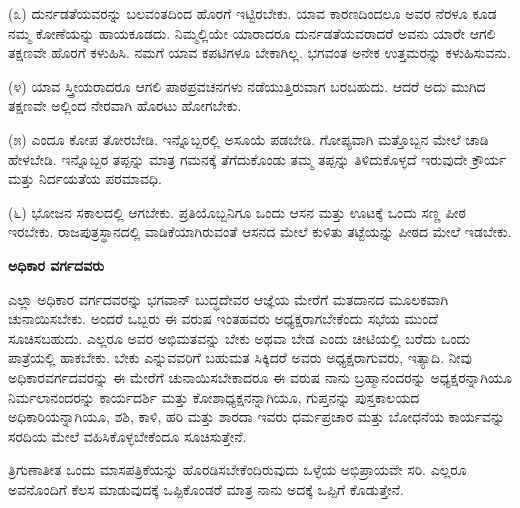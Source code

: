\vspace{0.15cm}

(೩) ದುರ್ನಡತೆಯವರನ್ನು ಬಲವಂತದಿಂದ ಹೊರಗೆ ಇಟ್ಟಿರಬೇಕು. ಯಾವ ಕಾರಣದಿಂದಲೂ ಅವರ ನೆರಳೂ ಕೂಡ ನಮ್ಮ ಕೋಣೆಯನ್ನು ಹಾಯಕೂಡದು. ನಿಮ್ಮಲ್ಲಿಯೇ ಯಾರಾದರೂ ದುರ್ನಡತೆಯವರಾದರೆ ಅವನು ಯಾರೇ ಆಗಲಿ ತಕ್ಷಣವೇ ಹೊರಗೆ ಕಳುಹಿಸಿ. ನಮಗೆ ಯಾವ ಕಪಟಿಗಳೂ ಬೇಕಾಗಿಲ್ಲ. ಭಗವಂತ ಅನೇಕ ಉತ್ತಮರನ್ನು ಕಳುಹಿಸುವನು.

\vspace{0.15cm}

(೪) ಯಾವ ಸ್ತ್ರೀಯರಾದರೂ ಆಗಲಿ ಪಾಠಪ್ರವಚನಗಳು ನಡೆಯುತ್ತಿರುವಾಗ ಬರಬಹುದು. ಆದರೆ ಅದು ಮುಗಿದ ತಕ್ಷಣವೇ ಅಲ್ಲಿಂದ ನೇರವಾಗಿ ಹೊರಟು ಹೋಗಬೇಕು.

\vspace{0.15cm}

(೫) ಎಂದೂ ಕೋಪ ತೋರಬೇಡಿ. ಇನ್ನೊಬ್ಬರಲ್ಲಿ ಅಸೂಯೆ ಪಡಬೇಡಿ. ಗೋಪ್ಯವಾಗಿ ಮತ್ತೊಬ್ಬನ ಮೇಲೆ ಚಾಡಿ ಹೇಳಬೇಡಿ. ಇನ್ನೊಬ್ಬರ ತಪ್ಪನ್ನು ಮಾತ್ರ ಗಮನಕ್ಕೆ ತೆಗೆದುಕೊಂಡು ತಮ್ಮ ತಪ್ಪನ್ನು ತಿಳಿದುಕೊಳ್ಳದೆ ಇರುವುದೇ ಕ್ರೌರ್ಯ ಮತ್ತು ನಿರ್ದಯತೆಯ ಪರಮಾವಧಿ.

\vspace{0.15cm}

(೬) ಭೋಜನ ಸಕಾಲದಲ್ಲಿ ಆಗಬೇಕು. ಪ್ರತಿಯೊಬ್ಬನಿಗೂ ಒಂದು ಆಸನ ಮತ್ತು ಊಟಕ್ಕೆ ಒಂದು ಸಣ್ಣ ಪೀಠ ಇರಬೇಕು. ರಾಜಪುತ್ರಸ್ಥಾನದಲ್ಲಿ ವಾಡಿಕೆಯಾಗಿರುವಂತೆ ಆಸನದ ಮೇಲೆ ಕುಳಿತು ತಟ್ಟೆಯನ್ನು ಪೀಠದ ಮೇಲೆ ಇಡಬೇಕು.
\eject

\begin{center}
\textbf{ಅಧಿಕಾರ ವರ್ಗದವರು}
\end{center}

\vspace{0.13cm}

ಎಲ್ಲಾ ಅಧಿಕಾರ ವರ್ಗದವರನ್ನು ಭಗವಾನ್ ಬುದ್ಧದೇವರ ಆಜ್ಞೆಯ ಮೇರೆಗೆ ಮತದಾನದ ಮೂಲಕವಾಗಿ ಚುನಾಯಿಸಬೇಕು. ಅಂದರೆ ಒಬ್ಬರು ಈ ವರುಷ ಇಂತಹವರು ಅಧ್ಯಕ್ಷರಾಗಬೇಕೆಂದು ಸಭೆಯ ಮುಂದೆ ಸೂಚಿಸಬಹುದು. ಎಲ್ಲರೂ ಅವರ ಅಭಿಮತವನ್ನು ಬೇಕು ಅಥವಾ ಬೇಡ ಎಂದು ಚೀಟಿಯಲ್ಲಿ ಬರೆದು ಒಂದು ಪಾತ್ರೆಯಲ್ಲಿ ಹಾಕಬೇಕು. ಬೇಕು ಎನ್ನುವವರಿಗೆ ಬಹುಮತ ಸಿಕ್ಕಿದರೆ ಅವರು ಅಧ್ಯಕ್ಷರಾಗುವರು, ಇತ್ಯಾದಿ. ನೀವು ಅಧಿಕಾರವರ್ಗದವರನ್ನು ಈ ಮೇರೆಗೆ ಚುನಾಯಿಸಬೇಕಾದರೂ ಈ ವರುಷ ನಾನು ಬ್ರಹ್ಮಾನಂದರನ್ನು ಅಧ್ಯಕ್ಷರನ್ನಾಗಿಯೂ ನಿರ್ಮಲಾನಂದರನ್ನು ಕಾರ್ಯದರ್ಶಿ ಮತ್ತು ಕೋಶಾಧ್ಯಕ್ಷನನ್ನಾಗಿಯೂ, ಗುಪ್ತನನ್ನು ಪುಸ್ತಕಾಲಯದ ಅಧಿಕಾರಿಯನ್ನಾಗಿಯೂ, ಶಶಿ, ಕಾಳಿ, ಹರಿ ಮತ್ತು ಶಾರದಾ ಇವರು ಧರ್ಮಪ್ರಚಾರ ಮತ್ತು ಬೋಧನೆಯ ಕಾರ್ಯವನ್ನು ಸರದಿಯ ಮೇಲೆ ವಹಿಸಿಕೊಳ್ಳಬೇಕೆಂದೂ ಸೂಚಿಸುತ್ತೇನೆ.

\vspace{0.4cm}

ತ್ರಿಗುಣಾತೀತ ಒಂದು ಮಾಸಪತ್ರಿಕೆಯನ್ನು ಹೊರಡಿಸಬೇಕೆಂದಿರುವುದು ಒಳ್ಳೆಯ ಅಭಿಪ್ರಾಯವೇ ಸರಿ. ಎಲ್ಲರೂ ಅವನೊಂದಿಗೆ ಕೆಲಸ ಮಾಡುವುದಕ್ಕೆ ಒಪ್ಪಿಕೊಂಡರೆ ಮಾತ್ರ ನಾನು ಅದಕ್ಕೆ ಒಪ್ಪಿಗೆ ಕೊಡುತ್ತೇನೆ.

\vspace{0.4cm}

